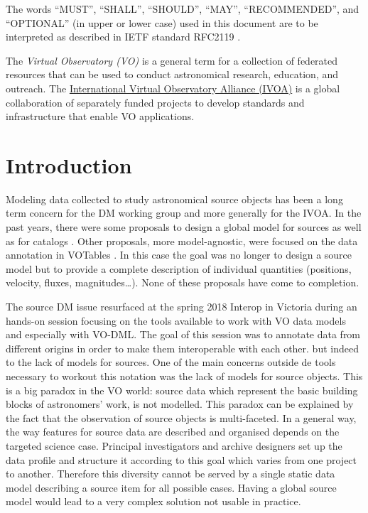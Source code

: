 \documentclass[11pt,a4paper]{ivoa}
\begin{document}
The words ``MUST'', ``SHALL'', ``SHOULD'', ``MAY'', ``RECOMMENDED'', and
``OPTIONAL'' (in upper or lower case) used in this document are to be
interpreted as described in IETF standard RFC2119 \citep{std:RFC2119}.

The \emph{Virtual Observatory (VO)} is a
general term for a collection of federated resources that can be used
to conduct astronomical research, education, and outreach.
The \href{http://www.ivoa.net}{International
Virtual Observatory Alliance (IVOA)} is a global
collaboration of separately funded projects to develop standards and
infrastructure that enable VO applications.


\section{Introduction}

Modeling data collected to study astronomical source objects has been a long term concern for the 
DM working group and more generally for the IVOA.
In the past years, there were some proposals to design a global model for sources \citep{wd:jesusdm}
as well as for catalogs \citep{wd:catalog}.
Other proposals, more model-agnostic, were focused on the data annotation in VOTables
\citep{note:stcvot} \citep{note:seb}.
In this case the goal was no longer to design a source model but to provide a complete description of
individual quantities (positions, velocity, fluxes, magnitudes…).
None of these proposals have come to completion.

The source DM issue resurfaced at the spring 2018 Interop in Victoria during an hands-on session
focusing on the tools available to work with VO data models and especially with VO-DML.
The goal of this session was to annotate data from different origins in order to make them
interoperable with each other.
but indeed to the lack of models for sources.
One of the main concerns outside de tools necessary to workout this notation was the lack of models
for source objects.
This is a big paradox in the VO world: source data which represent the basic building
blocks of astronomers' work, is not modelled.
This paradox can be explained by the fact that the observation of source objects is multi-faceted.
In a general way, the way features for source data are described and organised depends on
the targeted science case.
Principal investigators and archive designers set up the data profile and structure it according
to this goal which varies from one project to another.
Therefore this diversity cannot be served by a single static data model describing a source
item for all possible cases.
Having a global source model would lead to a very complex solution not usable in practice.
\end{document}

